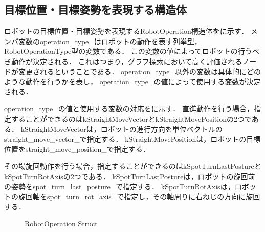 \subsection{目標位置・目標姿勢を表現する構造体}
ロボットの目標位置・目標姿勢を表現するRobotOperation構造体をに示す．
メンバ変数のoperation\_type\_はロボットの動作を表す列挙型，RobotOperationType型の変数である．
この変数の値によってロボットの行うべき動作が決定される．
これはつまり，グラフ探索において高く評価されるノードが変更されるということである．
operation\_type\_以外の変数は具体的にどのような動作を行うかを表し，
operation\_type\_の値によって使用する変数が決定される．

operation\_type\_の値と使用する変数の対応をに示す．
直進動作を行う場合，指定することができるのはkStraightMoveVectorとkStraightMovePositionの2つである．
kStraightMoveVectorは，ロボットの進行方向を単位ベクトルのstraight\_move\_vector\_で指定する．
kStraightMovePositionは，ロボットの目標位置をstraight\_move\_position\_で指定する．

その場旋回動作を行う場合，指定することができるのはkSpotTurnLastPostureとkSpotTurnRotAxisの2つである．
kSpotTurnLastPostureは，ロボットの旋回前の姿勢をspot\_turn\_last\_posture\_で指定する．
kSpotTurnRotAxisは，ロボットの旋回軸をspot\_turn\_rot\_axis\_で指定し，その軸周りに右ねじの方向に旋回する．
\\

\begin{figure}[h]
  \centering
  \caption{RobotOperation Struct}
  \label{fig:robot_operation}  %
\end{figure}

